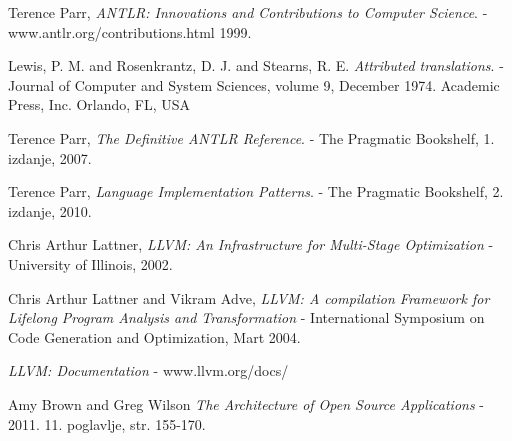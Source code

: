 \begin{thebibliography}{9}

   
	Terence Parr,
	\emph{ANTLR: Innovations and Contributions to Computer Science}.
	- www.antlr.org/contributions.html
	1999.

	Lewis, P. M. and Rosenkrantz, D. J. and Stearns, R. E.
	\emph{Attributed translations}.
	- Journal of Computer and System Sciences, 
	volume 9,
	December 1974.
	Academic Press, Inc. Orlando, FL, USA

	Terence Parr,
	\emph{The Definitive ANTLR Reference}.
	- The Pragmatic Bookshelf,
	1. izdanje,
	2007.

	Terence Parr,
	\emph{Language Implementation Patterns}.
	- The Pragmatic Bookshelf,
	2. izdanje,
	2010.

	Chris Arthur Lattner,
	\emph{LLVM: An Infrastructure for Multi-Stage Optimization}
	- University of Illinois, 2002.
	
	Chris Arthur Lattner and Vikram Adve,
	\emph{LLVM: A compilation Framework for Lifelong Program Analysis and Transformation}
	- International Symposium on Code Generation and Optimization, Mart 2004.
	
	\emph{LLVM: Documentation}
	- www.llvm.org/docs/
	
	Amy Brown and Greg Wilson
	\emph{The Architecture of Open Source Applications}
	- 2011. 11. poglavlje, str. 155-170. 

\end{thebibliography}
